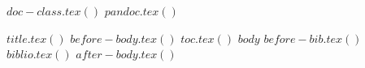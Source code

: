 $doc-class.tex()$
$pandoc.tex()$

$title.tex()$
$before-body.tex()$
$toc.tex()$
$body$
$before-bib.tex()$
$biblio.tex()$
$after-body.tex()$

